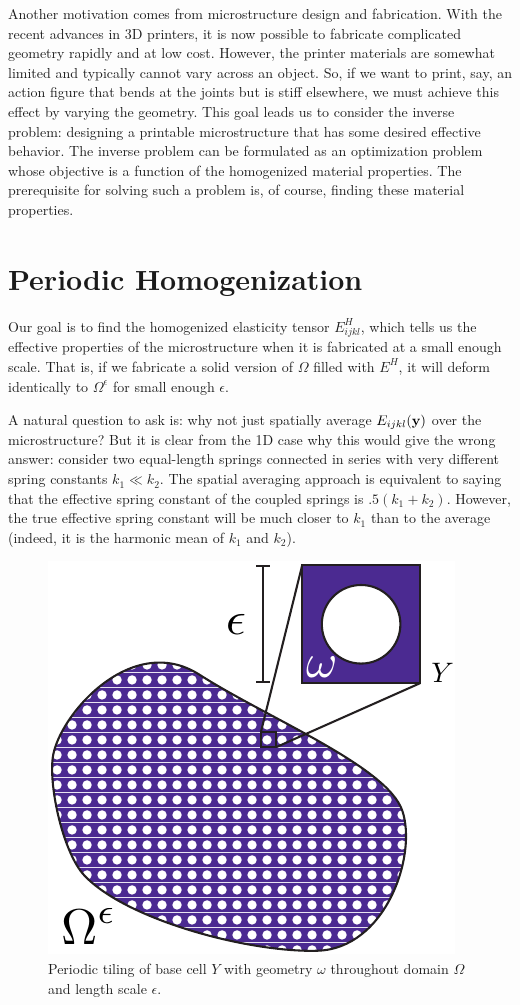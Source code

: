 \documentclass[10pt]{article}
\providecommand{\e}{\epsilon}
\begin{document}
Another motivation comes from microstructure design and fabrication. With the
recent advances in 3D printers, it is now possible to fabricate complicated
geometry rapidly and at low cost. However, the printer materials are somewhat
limited and typically cannot vary across an object. So, if we want to print,
say, an action figure that bends at the joints but is stiff elsewhere, we must
achieve this effect by varying the geometry. This goal leads us to consider the
inverse problem: designing a printable microstructure that has some desired
effective behavior. The inverse problem can be formulated as an optimization
problem whose objective is a function of the homogenized material properties.
The prerequisite for solving such a problem is, of course, finding these
material properties.

\section{Periodic Homogenization}
Our goal is to find the homogenized elasticity tensor $E^H_{ijkl}$,
which tells us the effective properties of the microstructure when it is
fabricated at a small enough scale. That is, if we fabricate a solid version of
$\Omega$ filled with $E^H$, it will deform identically to $\Omega^\e$ for small
enough $\e$.

A natural question to ask is: why not just spatially
average $E_{ijkl}({\bf y})$ over the microstructure? But it is clear from the
1D case why this would give the wrong answer: consider two equal-length springs
connected in series with very different spring constants $k_1 \ll k_2$. The
spatial averaging approach is equivalent to saying that the effective spring
constant of the coupled springs is $.5 (k_1 + k_2)$. However, the true
effective spring constant will be much closer to $k_1$ than to the average
(indeed, it is the harmonic mean of $k_1$ and $k_2$).

\begin{figure}
    \centering
    \includegraphics[width=.35\textwidth]{Images/periodic.pdf}
    \caption{Periodic tiling of base cell $Y$ with geometry $\omega$ throughout
    domain $\Omega$ and length scale $\e$.}
    \label{fig:periodic}
\end{figure}
\end{document}
